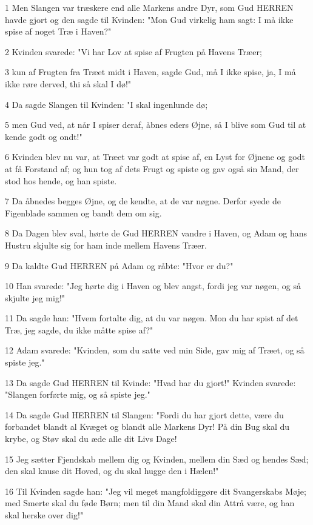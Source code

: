 \par 1 Men Slangen var træskere end alle Markens andre Dyr, som Gud HERREN havde gjort og den sagde til Kvinden: "Mon Gud virkelig ham sagt: I må ikke spise af noget Træ i Haven?"
\par 2 Kvinden svarede: "Vi har Lov at spise af Frugten på Havens Træer;
\par 3 kun af Frugten fra Træet midt i Haven, sagde Gud, må I ikke spise, ja, I må ikke røre derved, thi så skal I dø!"
\par 4 Da sagde Slangen til Kvinden: "I skal ingenlunde dø;
\par 5 men Gud ved, at når I spiser deraf, åbnes eders Øjne, så I blive som Gud til at kende godt og ondt!"
\par 6 Kvinden blev nu var, at Træet var godt at spise af, en Lyst for Øjnene og godt at få Forstand af; og hun tog af dets Frugt og spiste og gav også sin Mand, der stod hos hende, og han spiste.
\par 7 Da åbnedes begges Øjne, og de kendte, at de var nøgne. Derfor syede de Figenblade sammen og bandt dem om sig.
\par 8 Da Dagen blev sval, hørte de Gud HERREN vandre i Haven, og Adam og hans Hustru skjulte sig for ham inde mellem Havens Træer.
\par 9 Da kaldte Gud HERREN på Adam og råbte: "Hvor er du?"
\par 10 Han svarede: "Jeg hørte dig i Haven og blev angst, fordi jeg var nøgen, og så skjulte jeg mig!"
\par 11 Da sagde han: "Hvem fortalte dig, at du var nøgen. Mon du har spist af det Træ, jeg sagde, du ikke måtte spise af?"
\par 12 Adam svarede: "Kvinden, som du satte ved min Side, gav mig af Træet, og så spiste jeg."
\par 13 Da sagde Gud HERREN til Kvinde: "Hvad har du gjort!" Kvinden svarede: "Slangen forførte mig, og så spiste jeg."
\par 14 Da sagde Gud HERREN til Slangen: "Fordi du har gjort dette, være du forbandet blandt al Kvæget og blandt alle Markens Dyr! På din Bug skal du krybe, og Støv skal du æde alle dit Livs Dage!
\par 15 Jeg sætter Fjendskab mellem dig og Kvinden, mellem din Sæd og hendes Sæd; den skal knuse dit Hoved, og du skal hugge den i Hælen!"
\par 16 Til Kvinden sagde han: "Jeg vil meget mangfoldiggøre dit Svangerskabs Møje; med Smerte skal du føde Børn; men til din Mand skal din Attrå være, og han skal herske over dig!"
